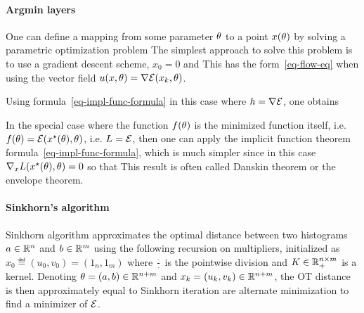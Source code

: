 \paragraph{Argmin layers}

One can define a mapping from some parameter $\theta$ to a point $x(\theta)$ by solving a parametric optimization problem
The simplest approach to solve this problem is to use a gradient descent scheme, $x_0=0$ and
This has the form~\eqref{eq-flow-eq} when using the vector field $u(x,\theta) = \nabla \mathcal{E}(x_k,\theta)$. 

Using formula~\eqref{eq-impl-func-formula} in this case where $h=\nabla \mathcal{E}$, one obtains

In the special case where the function $f(\theta)$ is the minimized function itself, i.e. $f(\theta)=\mathcal{E}(x^\star(\theta),\theta)$, i.e. $L=\mathcal{E}$, then one can apply the implicit function theorem formula~\eqref{eq-impl-func-formula}, which is much simpler since in this case $\nabla_x L(x^\star(\theta),\theta)=0$ so that 
This result is often called Danskin theorem or the envelope theorem. 


\paragraph{Sinkhorn's algorithm}

Sinkhorn algorithm approximates the optimal distance between two histograms $a \in \mathbb{R}^n$ and $b \in \mathbb{R}^m$ using the following recursion on multipliers, initialized as $x_0 \eqdef (u_0,v_0) = (1_n,1_m)$
where $\frac{\cdot}{\cdot}$ is the pointwise division and $K \in \mathbb{R}_+^{n \times m}$ is a kernel.
%
Denoting $\theta=(a,b) \in \mathbb{R}^{n+m}$ and $x_k=(u_k,v_k) \in \mathbb{R}^{n+m}$, the OT distance is then approximately equal to 
Sinkhorn iteration are alternate minimization to find a minimizer of $\mathcal{E}$. 

